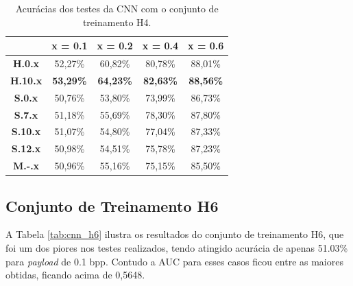 \begin{table}[!htb]
\centering
\begin{tabular}{c|c|c|c|c|}
\cline{2-5}
\textbf{}                             & \textbf{x = 0.1} & \textbf{x = 0.2} & \textbf{x = 0.4} & \textbf{x = 0.6} \\ \hline
\multicolumn{1}{|c|}{\textbf{H.0.x}}  & 52,27\%          & 60,82\%          & 80,78\%          & 88,01\%          \\ \hline
\multicolumn{1}{|c|}{\textbf{H.10.x}} & \textbf{53,29\%} & \textbf{64,23\%} & \textbf{82,63\%} & \textbf{88,56\%} \\ \hline
\multicolumn{1}{|c|}{\textbf{S.0.x}}  & 50,76\%          & 53,80\%          & 73,99\%          & 86,73\%          \\ \hline
\multicolumn{1}{|c|}{\textbf{S.7.x}}  & 51,18\%          & 55,69\%          & 78,30\%          & 87,80\%          \\ \hline
\multicolumn{1}{|c|}{\textbf{S.10.x}} & 51,07\%          & 54,80\%          & 77,04\%          & 87,33\%          \\ \hline
\multicolumn{1}{|c|}{\textbf{S.12.x}} & 50,98\%          & 54,51\%          & 75,78\%          & 87,23\%          \\ \hline
\multicolumn{1}{|c|}{\textbf{M.-.x}}  & 50,96\%          & 55,16\%          & 75,15\%          & 85,50\%          \\ \hline
\end{tabular}
\caption{Acurácias dos testes da CNN com o conjunto de treinamento H4.}
\label{tab:cnn_h4}
\end{table}


\subsection{Conjunto de Treinamento H6}

A Tabela \ref{tab:cnn_h6} ilustra os resultados do conjunto de treinamento H6, que foi um dos piores nos testes realizados, tendo atingido acurácia de apenas 51.03\% para \textit{payload} de 0.1 bpp. Contudo a AUC para esses casos ficou entre as maiores obtidas, ficando acima de 0,5648.


